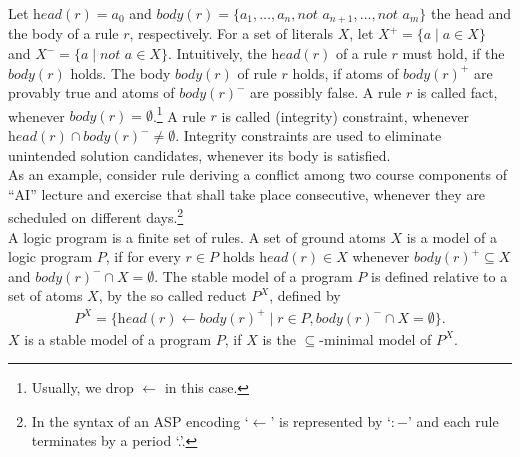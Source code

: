 \documentclass{easychair}
\newcommand{\ASP}{ASP}
\newcommand{\naf}{\textit{not }}
\newcommand{\head}{\textit{head}}
\newcommand{\body}{\textit{body}}
\begin{document}
  Let $\head{(r)} = a_0$ and $\body{(r)} = \{a_1,\dots,a_n,\naf{} a_{n+1},\dots,\naf{} a_m\}$ the head and the body of a rule $r$, respectively. 
  For a set of literals $X$, let $X^+ = \{a \mid a\in X \}$ and $X^- = \{a \mid \naf{} a\in X\}$. 
  Intuitively, the $\head{(r)}$ of a rule $r$ must hold, if the $\body{(r)}$ holds. 
  The body $\body{(r)}$ of rule $r$ holds, if atoms of $\body{(r)}^+$ are provably true and atoms of $\body{(r)}^-$ are possibly false. 
  A rule $r$ is called fact, whenever $\body{(r)}=\emptyset$.\footnote{Usually, we drop $\leftarrow$ in this case.} 
  A rule $r$ is called (integrity) constraint, whenever $\head{(r)}\cap\body{(r)}^-\neq\emptyset$. %
  Integrity constraints are used to eliminate unintended solution candidates, whenever its body is satisfied. \\
  As an example, consider rule 
  deriving a conflict among two course components of ``AI'' lecture and exercise that shall take place consecutive, whenever they are scheduled on different days.\footnote{In the syntax of an \ASP{} encoding `$\leftarrow$' is represented by `$:-$' and each rule terminates by a period `.'.}  \\
  A logic program is a finite set of rules. 
  A set of ground atoms $X$ is a model of a logic program $P$, if for every $r\in P$ holds $\head{(r)}\in X$ whenever $\body{(r)}^+\subseteq X$ and $\body{(r)}^-\cap X=\emptyset$.
  The stable model of a program $P$ is defined relative to a set of atoms $X$, by the so called reduct $P^X$, defined by 
  \begin{align*}
    P^X=\{\head{(r)}\leftarrow \body{(r)}^+\mid r\in P, \body{(r)}^-\cap X = \emptyset\}.
  \end{align*}
  $X$ is a stable model of a program $P$, if $X$ is the $\subseteq$-minimal model of $P^X$. \\
\end{document}
